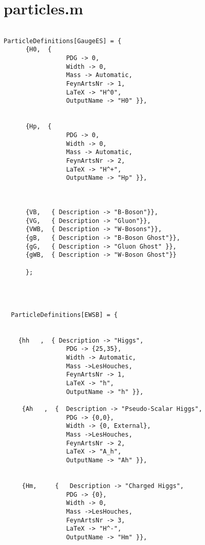 

\section{particles.m}
\begin{lstlisting}

ParticleDefinitions[GaugeES] = {
      {H0,  { 
                 PDG -> 0,
                 Width -> 0, 
                 Mass -> Automatic,
                 FeynArtsNr -> 1,
                 LaTeX -> "H^0",
                 OutputName -> "H0" }},                         
      
      
      {Hp,  { 
                 PDG -> 0,
                 Width -> 0, 
                 Mass -> Automatic,
                 FeynArtsNr -> 2,
                 LaTeX -> "H^+",
                 OutputName -> "Hp" }}, 
                 
               
    
      {VB,   { Description -> "B-Boson"}},                                                   
      {VG,   { Description -> "Gluon"}},          
      {VWB,  { Description -> "W-Bosons"}},          
      {gB,   { Description -> "B-Boson Ghost"}},                                                   
      {gG,   { Description -> "Gluon Ghost" }},          
      {gWB,  { Description -> "W-Boson Ghost"}}
      
      };
      
      
      
      
  ParticleDefinitions[EWSB] = {
            
      
    {hh   ,  { Description -> "Higgs",
                 PDG -> {25,35},
                 Width -> Automatic, 
                 Mass ->LesHouches,
                 FeynArtsNr -> 1,
                 LaTeX -> "h",
                 OutputName -> "h" }}, 
                 
     {Ah   ,  {  Description -> "Pseudo-Scalar Higgs",
                 PDG -> {0,0},
                 Width -> {0, External}, 
                 Mass ->LesHouches,
                 FeynArtsNr -> 2,
                 LaTeX -> "A_h",
                 OutputName -> "Ah" }},                      
      
      
     {Hm,     {   Description -> "Charged Higgs", 
                 PDG -> {0},
                 Width -> 0, 
                 Mass ->LesHouches,
                 FeynArtsNr -> 3,
                 LaTeX -> "H^-",
                 OutputName -> "Hm" }},                                              
      

\end{lstlisting}
